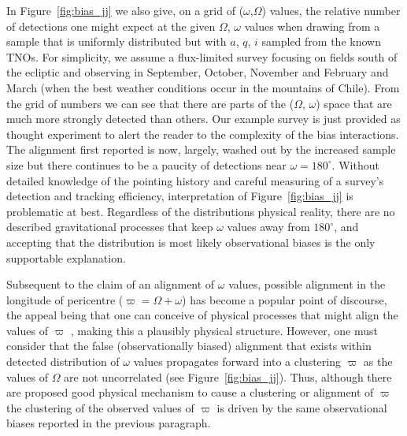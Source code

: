 \documentclass{aastex62}
\begin{document}
In Figure~\ref{fig:bias_jj} we also give, on a grid of ($\omega$,$\Omega$) values, the relative
number of detections one might expect at the given $\Omega$,
$\omega$ values when drawing from a sample that is uniformly
distributed but with $a$, $q$, $i$ sampled from the known TNOs.
For simplicity, we assume a flux-limited survey focusing on fields south of the
ecliptic and observing in September, October, November and February
and March (when the best weather conditions occur in the mountains of Chile).  
From the grid of numbers we can see that there are parts
of the ($\Omega$, $\omega$) space that are much more strongly detected than others.  Our
example survey is just provided as thought experiment to alert the
reader to the complexity of the bias interactions. The alignment first
reported is now, largely, washed out by the increased sample size but
there continues to be a paucity of detections near $\omega = 180^{\circ}$.
Without detailed knowledge of the pointing history and careful
measuring of a survey's detection and tracking efficiency,
interpretation of Figure~\ref{fig:bias_jj} is problematic at best.  Regardless of the
distributions physical reality, there are no described gravitational
processes that keep $\omega$ values away from $180^{\circ}$, and
accepting that the distribution is most likely observational biases is
the only supportable explanation.

Subsequent to the claim of an alignment of $\omega$ values, possible
alignment in the longitude of pericentre ($\varpi=\Omega+\omega$) has become
a popular point of discourse,  the appeal being that one can conceive
of physical processes that might align the values of $\varpi$ \citep[e.g.][]{batyginbrown16},
making this a plausibly physical structure.  However, one must
consider that the false (observationally biased) alignment that exists within detected distribution of $\omega$ values
propagates forward into a clustering $\varpi$ as the values of
$\Omega$ are not uncorrelated (see Figure~\ref{fig:bias_jj}).  Thus, although there
are proposed good physical mechanism to cause a clustering or alignment of
$\varpi$ the clustering of the observed values of
$\varpi$ is driven by the same observational biases reported
in the previous paragraph.
\end{document}
